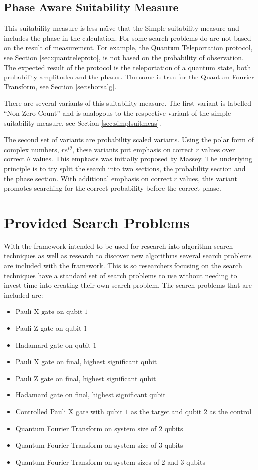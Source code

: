 \subsection{Phase Aware Suitability Measure}
\label{sec:phaseawaresuitmeas}
This suitability measure is less na\"{\i}ve that the Simple suitability measure and includes the phase in the calculation.
For some search problems do are not based on the result of measurement.
For example, the Quantum Teleportation protocol, see Section \ref{sec:quantteleproto}, is not based on the probability of observation.
The expected result of the protocol is the teleportation of a quantum state, both probability amplitudes and the phases.
The same is true for the Quantum Fourier Transform, see Section \ref{sec:shorsalg}.

There are several variants of this suitability measure.
The first variant is labelled ``Non Zero Count'' and is analogous to the respective variant of the simple suitability measure, see Section \ref{sec:simplsuitmeas}.

The second set of variants are probability scaled variants.
Using the polar form of complex numbers, $re^{i\theta}$, these variants put emphasis on correct $r$ values over correct $\theta$ values.
This emphasis was initially proposed by Massey\cite{masseythesis}.
The underlying principle is to try split the search into two sections, the probability section and the phase section.
With additional emphasis on correct $r$ values, this variant promotes searching for the correct probability before the correct phase.

\section{Provided Search Problems}
\label{sec:provsearchprobs}
With the framework intended to be used for research into algorithm search techniques as well as research to discover new algorithms several search problems are included with the framework.
This is so researchers focusing on the search techniques have a standard set of search problems to use without needing to invest time into creating their own search problem.
The search problems that are included are:
\begin{itemize}
 \item Pauli X gate on qubit $1$
 \item Pauli Z gate on qubit $1$
 \item Hadamard gate on qubit $1$
 \item Pauli X gate on final, highest significant qubit
 \item Pauli Z gate on final, highest significant qubit
 \item Hadamard gate on final, highest significant qubit
 \item Controlled Pauli X gate with qubit $1$ as the target and qubit $2$ as the control
 \item Quantum Fourier Transform on system size of $2$ qubits
 \item Quantum Fourier Transform on system size of $3$ qubits
 \item Quantum Fourier Transform on system sizes of $2$ and $3$ qubits
\end{itemize}

